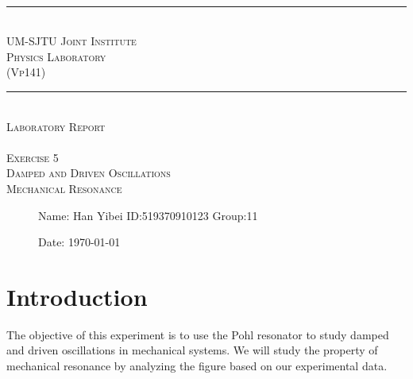 \documentclass[12pt,a4paper]{article}
\begin{document}
\begin{center}
~\\
\rule[0mm]{400pt}{0.5pt}
\Large{ \textsc{\newline\\UM-SJTU Joint Institute\\Physics Laboratory\\(Vp141)\\}}
\rule[0mm]{400pt}{0.5pt}
\Large{ \textsc{\newline\newline\newline\newline\newline\newline\\
Laboratory Report\\}}
\Large{\textsc{ \\ Exercise 5  \\ Damped and Driven Oscillations \\
Mechanical Resonance} }

\end{center}

\begin{description}
    \item[] 
    \item[] 
    \item[] 
    \item[] 
    \item[] 
    \item[]
    \item[]\qquad \qquad Name: Han Yibei \qquad ID:519370910123   \qquad    Group:11\\
    \item[]\qquad \qquad Date: \today
\end{description}

\newpage


\section{Introduction}

The objective of this experiment is to use the Pohl resonator to study damped and driven oscillations in mechanical systems. We will study the property of mechanical resonance by analyzing the figure based on our experimental data.
\end{document}
